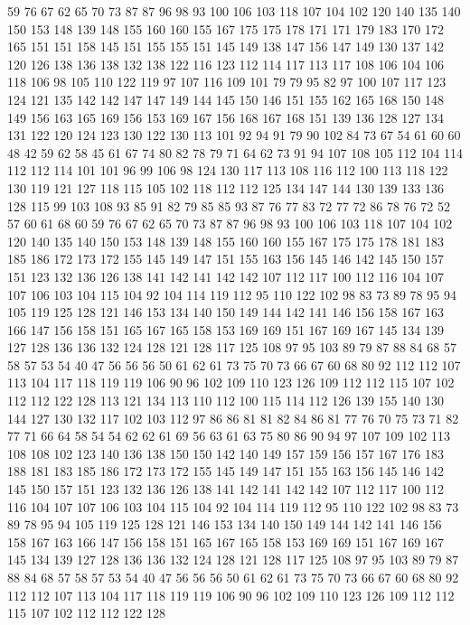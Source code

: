 59 76 67 62 65 70 73 87 87 96 98 93 100 106 103 118 107 104 102 120
140 135 140 150 153 148 139 148 155 160 160 155 167 175 175 178 171 171 179 183
170 172 165 151 151 158 145 151 155 155 151 145 149 138 147 156 147 149 130 137
142 120 126 138 136 138 132 138 122 116 123 112 114 117 113 117 108 106 104 106
118 106 98 105 110 122 119 97 107 116 109 101 79 79 95 82 97 100 107 117
123 124 121 135 142 142 147 147 149 144 145 150 146 151 155 162 165 168 150 148
149 156 163 165 169 156 153 169 167 156 168 167 168 151 139 136 128 127 134 131
122 120 124 123 130 122 130 113 101 92 94 91 79 90 102 84 73 67 54 61
60 60 48 42 59 62 58 45 61 67 74 80 82 78 79 71 64 62 73 91
94 107 108 105 112 104 114 112 112 114 101 101 96 99 106 98 124 130 117 113
108 116 112 100 113 118 122 130 119 121 127 118 115 105 102 118 112 112 125 134
147 144 130 139 133 136 128 115 99 103 108 93 85 91 82 79 85 85 93 87
76 77 83 72 77 72 86 78 76 72 52 57 60 61 68 60 59 76 67 62
65 70 73 87 87 96 98 93 100 106 103 118 107 104 102 120 140 135 140 150
153 148 139 148 155 160 160 155 167 175 175 178 181 183 185 186 172 173 172 155
145 149 147 151 155 163 156 145 146 142 145 150 157 151 123 132 136 126 138 141
142 141 142 142 107 112 117 100 112 116 104 107 107 106 103 104 115 104 92 104
114 119 112 95 110 122 102 98 83 73 89 78 95 94 105 119 125 128 121 146
153 134 140 150 149 144 142 141 146 156 158 167 163 166 147 156 158 151 165 167
165 158 153 169 169 151 167 169 167 145 134 139 127 128 136 136 132 124 128 121
128 117 125 108 97 95 103 89 79 87 88 84 68 57 58 57 53 54 40 47
56 56 56 50 61 62 61 73 75 70 73 66 67 60 68 80 92 112 112 107
113 104 117 118 119 119 106 90 96 102 109 110 123 126 109 112 112 115 107 102
112 112 122 128 113 121 134 113 110 112 100 115 114 112 126 139 155 140 130 144
127 130 132 117 102 103 112 97 86 86 81 81 82 84 86 81 77 76 70 75
73 71 82 77 71 66 64 58 54 54 62 62 61 69 56 63 61 63 75 80
86 90 94 97 107 109 102 113 108 108 102 123 140 136 138 150 150 142 140 149
157 159 156 157 167 176 183 188 181 183 185 186 172 173 172 155 145 149 147 151
155 163 156 145 146 142 145 150 157 151 123 132 136 126 138 141 142 141 142 142
107 112 117 100 112 116 104 107 107 106 103 104 115 104 92 104 114 119 112 95
110 122 102 98 83 73 89 78 95 94 105 119 125 128 121 146 153 134 140 150
149 144 142 141 146 156 158 167 163 166 147 156 158 151 165 167 165 158 153 169
169 151 167 169 167 145 134 139 127 128 136 136 132 124 128 121 128 117 125 108
97 95 103 89 79 87 88 84 68 57 58 57 53 54 40 47 56 56 56 50
61 62 61 73 75 70 73 66 67 60 68 80 92 112 112 107 113 104 117 118
119 119 106 90 96 102 109 110 123 126 109 112 112 115 107 102 112 112 122 128
